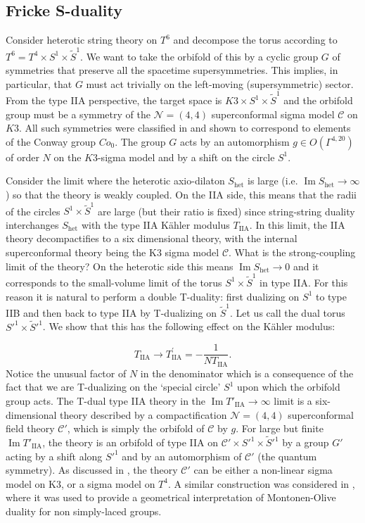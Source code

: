 \documentclass[a4paper,11pt]{article}
\newcommand{\C}{\mathcal{C}}
\DeclareMathOperator{\im}{Im}
\numberwithin{equation}{section}
\def\be{\begin{equation}}
\def\ee{\end{equation}}
\begin{document}
\subsection{Fricke S-duality}


Consider heterotic string theory on $T^6$ and decompose the torus according to 
$T^6=T^4 \times S^1\times \tilde{S}^1$.
 We want to take the orbifold of this by a cyclic group $G$ of symmetries that preserve all the spacetime supersymmetries. This implies, in particular, that $G$ must act trivially on the left-moving (supersymmetric) sector. From the type IIA perspective, the target space is  $K3\times S^1\times \tilde{S}^1$ and the orbifold group must be a symmetry of the $\mathcal{N}=(4,4)$ superconformal sigma model $\mathcal{C}$ on $K3$. All such symmetries were classified in \cite{K3symm} and shown to correspond to elements of the Conway group $Co_0$. The group $G$ acts by an automorphism $g\in O(\Gamma^{4,20})$ of order $N$ on the $K3$-sigma model and by a shift on the circle $S^1$. 


Consider the limit where the heterotic axio-dilaton $S_{\text{het}}$ is large (i.e. $\im S_{\text{het}} \to \infty$) so that the theory is weakly coupled. On the IIA side, this means that the radii of the circles $S^1\times \tilde{S}^1$ are large (but their ratio is fixed) since string-string duality interchanges $S_{\text{het}}$ with the type IIA K\"ahler modulus $T_{\text{IIA}}$. In this limit, the IIA theory decompactifies to a six dimensional theory, with the internal superconformal theory being the K3 sigma  model $\mathcal{C}$. What is the strong-coupling limit of the theory? On the heterotic side this means $\im S_{\text{het}} \to 0$ and it  corresponds to the small-volume limit of the torus $S^1\times \tilde{S}^1$ in type IIA. For this reason it is natural to perform a double T-duality: first dualizing on $S^1$ to type IIB and then back to type IIA by T-dualizing on $\tilde{S}^1$. Let us call the dual torus $S'^1\times \tilde{S}'^1$. We show that this has the following effect on the K\"ahler modulus:

\be
T_{\text{IIA}}\longrightarrow T^{\prime}_{\text{IIA}}= -\frac{1}{N T_{\text{IIA}}}.
\label{DoubleT}
\ee
Notice the unusual factor of $N$ in the denominator which is a consequence of the fact that we are T-dualizing on the `special circle' $S^1$ upon which the orbifold group acts. The T-dual type IIA theory in the $\im T'_{\text{IIA}}\to \infty$ limit is a six-dimensional theory described by a compactification $\mathcal{N}=(4,4)$ superconformal field theory $\mathcal{C}'$, which is simply the orbifold of $\C$ by $g$. For large but finite $\im T'_{\text{IIA}}$, the theory is an orbifold of type IIA on $\C'\times {S'^1}\times{\tilde {S}'^1}$ by a group $G'$ acting by a shift along ${S'}^1$ and by an automorphism of $\C'$ (the quantum symmetry).  As discussed in \cite{Gaberdiel:2012um}, the theory $\mathcal{C}'$ can be either a  non-linear sigma model on K3, or a sigma model on $T^4$. A similar construction was considered in \cite{Vafa:1997mh}, where it was used to provide a geometrical interpretation of Montonen-Olive duality for non simply-laced groups.
\end{document}
